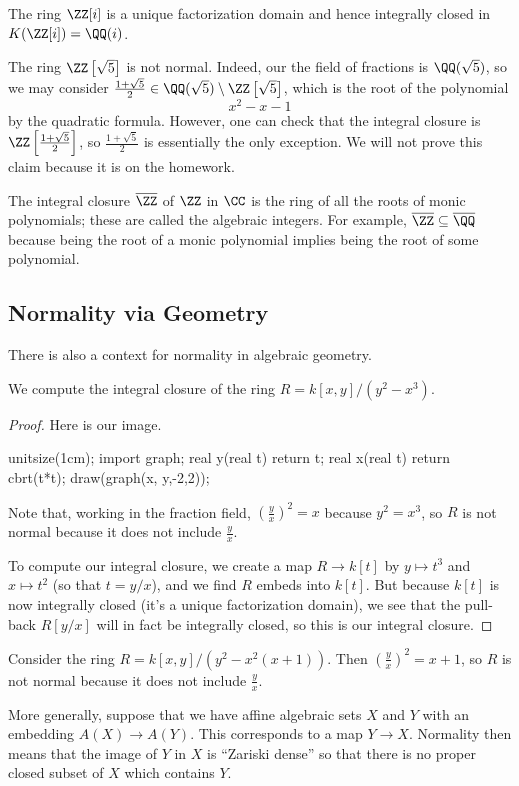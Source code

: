 \begin{example}
	The ring $\ZZ[i]$ is a unique factorization domain and hence integrally closed in $K(\ZZ[i])=\QQ(i)$.
\end{example}
\begin{nex} \label{nex:zrootfivenotnormal}
	The ring $\ZZ\left[\sqrt5\right]$ is not normal. Indeed, our the field of fractions is $\QQ(\sqrt5)$, so we may consider $\frac{1+\sqrt5}2\in\QQ(\sqrt5)\setminus\ZZ\left[\sqrt5\right]$, which is the root of the polynomial
	\[x^2-x-1\]
	by the quadratic formula. However, one can check that the integral closure is $\ZZ\left[\frac{1+\sqrt5}2\right]$, so $\frac{1+\sqrt5}2$ is essentially the only exception. We will not prove this claim because it is on the homework.
\end{nex}
\begin{example}
	The integral closure $\overline\ZZ$ of $\ZZ$ in $\CC$ is the ring of all the roots of monic polynomials; these are called the algebraic integers. For example, $\overline\ZZ\subseteq\overline\QQ$ because being the root of a monic polynomial implies being the root of some polynomial.
\end{example}

\subsection{Normality via Geometry}
There is also a context for normality in algebraic geometry.
\begin{exe}
	We compute the integral closure of the ring $R=k[x,y]/\left(y^2-x^3\right)$.
\end{exe}
\begin{proof}
	Here is our image.
	\begin{center}
		\begin{asy}
			unitsize(1cm);
			import graph;
			real y(real t)
			{
				return t;
			}
			real x(real t)
			{
				return cbrt(t*t);
			}
			draw(graph(x, y,-2,2));
		\end{asy}
	\end{center}
	Note that, working in the fraction field, $\left(\frac yx\right)^2=x$ because $y^2=x^3$, so $R$ is not normal because it does not include $\frac yx$.

	To compute our integral closure, we create a map $R\to k[t]$ by $y\mapsto t^3$ and $x\mapsto t^2$ (so that $t=y/x$), and we find $R$ embeds into $k[t]$. But because $k[t]$ is now integrally closed (it's a unique factorization domain), we see that the pull-back $R[y/x]$ will in fact be integrally closed, so this is our integral closure.
\end{proof}
\begin{example}
	Consider the ring $R=k[x,y]/\left(y^2-x^2(x+1)\right)$. Then $\left(\frac yx\right)^2=x+1$, so $R$ is not normal because it does not include $\frac yx$.
\end{example}
More generally, suppose that we have affine algebraic sets $X$ and $Y$ with an embedding $A(X)\to A(Y)$. This corresponds to a map $Y\to X$. Normality then means that the image of $Y$ in $X$ is ``Zariski dense'' so that there is no proper closed subset of $X$ which contains $Y$.

